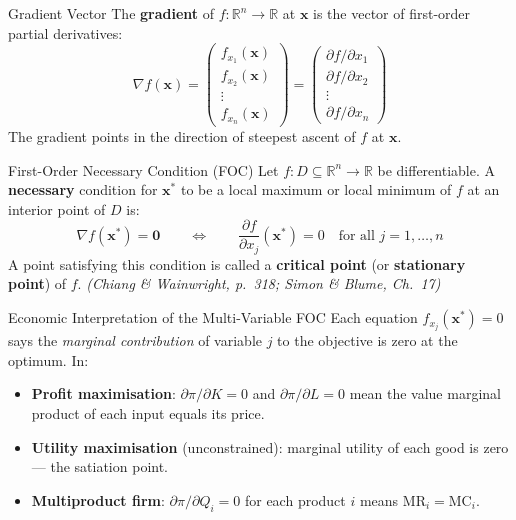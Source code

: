 \documentclass[12pt, a4paper]{article}
\theoremstyle{definition}
\newcommand{\R}{\mathbb{R}}
\newcommand{\bx}{\mathbf{x}}
\newcommand{\bz}{\mathbf{0}}
\newcommand{\pp}[2]{\dfrac{\partial #1}{\partial #2}}
\begin{document}
\begin{defbox}{Gradient Vector}
The \textbf{gradient} of $f: \R^n \to \R$ at $\bx$ is the vector of
first-order partial derivatives:
\[
  \nabla f(\bx)
  = \begin{pmatrix}
      f_{x_1}(\bx) \\ f_{x_2}(\bx) \\ \vdots \\ f_{x_n}(\bx)
    \end{pmatrix}
  = \begin{pmatrix}
      \partial f/\partial x_1 \\
      \partial f/\partial x_2 \\
      \vdots \\
      \partial f/\partial x_n
    \end{pmatrix}
\]
The gradient points in the direction of steepest ascent of $f$ at $\bx$.
\end{defbox}

\begin{thmbox}{First-Order Necessary Condition (FOC)}
Let $f: D \subseteq \R^n \to \R$ be differentiable. A \textbf{necessary}
condition for $\bx^*$ to be a local maximum or local minimum of $f$ at an
interior point of $D$ is:
\[
  \boxed{\nabla f(\bx^*) = \bz}
  \qquad\Longleftrightarrow\qquad
  \pp{f}{x_j}(\bx^*) = 0 \quad \text{for all } j = 1, \ldots, n
\]
A point satisfying this condition is called a \textbf{critical point}
(or \textbf{stationary point}) of $f$.
\emph{(Chiang \& Wainwright, p.\ 318; Simon \& Blume, Ch.\ 17)}
\end{thmbox}

\begin{keybox}{Economic Interpretation of the Multi-Variable FOC}
Each equation $f_{x_j}(\bx^*) = 0$ says the \emph{marginal contribution}
of variable $j$ to the objective is zero at the optimum. In:
\begin{itemize}
  \item \textbf{Profit maximisation}: $\partial\pi/\partial K = 0$ and
        $\partial\pi/\partial L = 0$ mean the value marginal product of
        each input equals its price.
  \item \textbf{Utility maximisation} (unconstrained): marginal utility of
        each good is zero --- the satiation point.
  \item \textbf{Multiproduct firm}: $\partial\pi/\partial Q_i = 0$ for each
        product $i$ means $\text{MR}_i = \text{MC}_i$.
\end{itemize}
\end{keybox}
\end{document}
